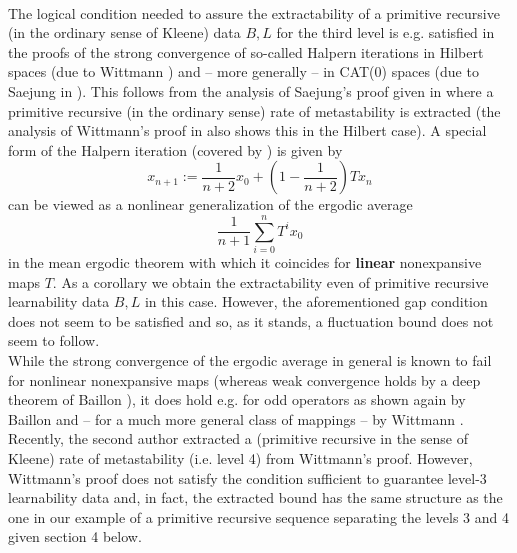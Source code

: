 \documentclass[1p]{elsarticle}
\theoremstyle{plain}
\theoremstyle{definition}
\theoremstyle{remark}
\theoremstyle{definition}
\begin{document}
\\[1mm] The logical condition needed to assure the extractability of a 
primitive recursive 
(in the ordinary sense of Kleene) data $B,L$ for the third 
level is e.g. satisfied in 
the proofs of the strong convergence of so-called Halpern iterations 
in Hilbert spaces (due to Wittmann \cite{Wittmann(92)}) and -- more 
generally --  in CAT(0) spaces (due to Saejung in 
\cite{Saejung}). This follows from the 
analysis of Saejung's proof 
given in \cite{Kohlenbach/Leustean6} where a primitive 
recursive (in the ordinary sense) rate of metastability is extracted
(the analysis of Wittmann's proof in \cite{Kohlenbach(Browder)} also 
shows this in the Hilbert case).  
A special form of the Halpern iteration (covered by 
\cite{Wittmann(92),Saejung}) is given by  
\[ x_{n+1} :=\frac{1}{n+2}x_0+\left(1-\frac{1}{n+2}\right) Tx_n \]
can be viewed as a nonlinear generalization of 
the ergodic average 
\[ \frac{1}{n+1}\sum^n_{i=0}T^ix_0 \] 
in the mean ergodic theorem with which it coincides 
for {\bf linear} nonexpansive  maps $T.$ 
As a corollary we obtain the extractability even 
of primitive recursive learnability data $B,L$ in this case. 
However, the aforementioned gap condition does not seem to be 
satisfied and so, as it stands, a fluctuation bound does not seem 
to follow.
\\[1mm]  
While the strong convergence of the ergodic average in general is known 
to fail for nonlinear nonexpansive maps (whereas weak convergence 
holds by a deep theorem of Baillon \cite{Baillon(75)}), 
it does hold e.g. 
for odd operators as shown again by Baillon \cite{Baillon(76)} 
and -- for a much more 
general class of mappings -- by Wittmann \cite{Wittmann(90)}. 
Recently, the second author 
\cite{Safarik(11)} extracted 
a (primitive recursive in the sense of Kleene) rate of metastability 
(i.e. level 4) from Wittmann's proof. However, Wittmann's proof does 
not satisfy the condition sufficient to guarantee level-3 learnability 
data and, in fact, the extracted bound has the same structure as the 
one in our example of a primitive recursive sequence separating the 
levels 3 and 4 given section 4 below. 
\end{document}
